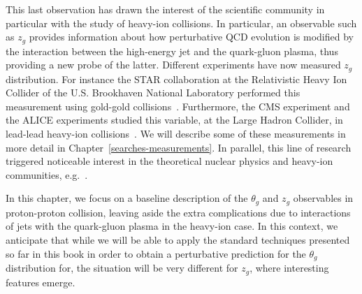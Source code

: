 This last observation has drawn the interest of the scientific
community in particular with the study of heavy-ion collisions. In
particular, an observable such as $z_g$ provides information about how
perturbative QCD evolution is modified by the interaction between the
high-energy jet and the quark-gluon plasma, thus providing a new probe
of the latter.
%
Different experiments have now measured $z_g$ distribution. For
instance the STAR collaboration at the Relativistic Heavy Ion Collider
of the U.S. Brookhaven National Laboratory performed this measurement
using gold-gold collisions~\cite{Kauder:2017mhg}. Furthermore, the CMS
experiment and the ALICE experiments studied this variable, at the
Large Hadron Collider, in lead-lead heavy-ion
collisions~\cite{Chen:2017rhw,Caffarri:2017bmh}. We will describe some
of these measurements in more detail in
Chapter~\ref{searches-measurements}.
%
In parallel, this line of research triggered noticeable interest in
the theoretical nuclear physics and heavy-ion communities,
e.g.~\cite{Lapidus:2017dek,Zapp:2017ria,Tywoniuk:2017dzi,Casalderrey-Solana:2017mjg,Mangano:2017plv,Qin:2017roz,Milhano:2017nzm,Chang:2017gkt,KunnawalkamElayavalli:2017hxo}.

In this chapter, we focus on a baseline description of the $\theta_g$
and $z_g$ observables in proton-proton collision, leaving aside the
extra complications due to interactions of jets with the quark-gluon
plasma in the heavy-ion case.
%
In this context, we anticipate that while we will be able to apply the
standard techniques presented so far in this book in order to obtain a
perturbative prediction for the $\theta_g$ distribution for, the
situation will be very different for $z_g$, where interesting features
emerge.

